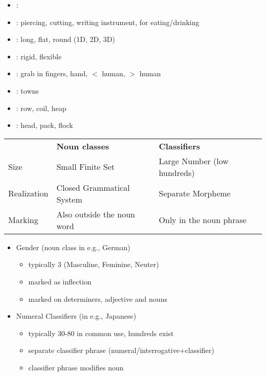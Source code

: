\documentclass[headrule,footrule]{foils}
\begin{document}
\begin{itemize}
\item {}: 
\item {}: piercing, cutting, writing instrument, for eating/drinking
\item {}: long, flat, round (1D, 2D, 3D)
\item {}: rigid, flexible
\item {}: grab in fingers, hand, $<$ human, $>$ human
\item {}: towns
\item {}: row, coil, heap
\item {}: head, pack, flock
\end{itemize}


\noindent\begin{tabular}{lll}
  & \textbf{Noun classes} & \textbf{Classifiers} \\
Size & Small Finite Set & Large Number (low hundreds) \\
Realization & Closed Grammatical System & Separate Morpheme \\
Marking & Also outside the noun word & Only in the noun phrase
\end{tabular}

\begin{itemize}
\item Gender (noun class in e.g., German)
  \begin{itemize}
  \item typically 3 (Masculine, Feminine, Neuter)
  \item marked as inflection
  \item marked on determiners, adjective and nouns
  \end{itemize}
\item Numeral Classifiers (in e.g., Japanese)
  \begin{itemize}
  \item typically 30-80 in common use, hundreds exist
  \item separate classifier phrase (numeral/interrogative+classifier)
  \item classifier phrase modifies noun
  \end{itemize}
\end{itemize}
\end{document}
